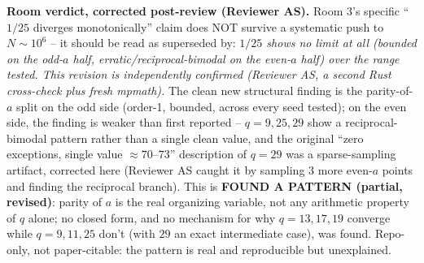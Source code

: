 \textbf{Room verdict, corrected post-review (Reviewer AS).} Room 3's specific ``$1/25$
diverges monotonically'' claim does NOT survive a systematic push to $N\sim10^6$ -- it should be
read as superseded by: \emph{$1/25$ shows no limit at all (bounded on the odd-$a$ half,
erratic/reciprocal-bimodal on the even-$a$ half) over the range tested. This revision is
independently confirmed (Reviewer AS, a second Rust cross-check plus fresh mpmath).} The clean new
structural finding is the parity-of-$a$ split on the odd side (order-1, bounded, across every seed
tested); on the even side, the finding is weaker than first reported -- $q=9,25,29$ show a
reciprocal-bimodal pattern rather than a single clean value, and the original ``zero exceptions,
single value $\approx70$--$73$'' description of $q=29$ was a sparse-sampling artifact, corrected
here (Reviewer AS caught it by sampling 3 more even-$a$ points and finding the reciprocal branch).
This is \textbf{FOUND A PATTERN (partial, revised)}: parity of $a$ is the real organizing
variable, not any arithmetic property of $q$ alone; no closed form, and no mechanism for why
$q=13,17,19$ converge while $q=9,11,25$ don't (with $29$ an exact intermediate case), was found.
Repo-only, not paper-citable: the pattern is real and reproducible but unexplained.
